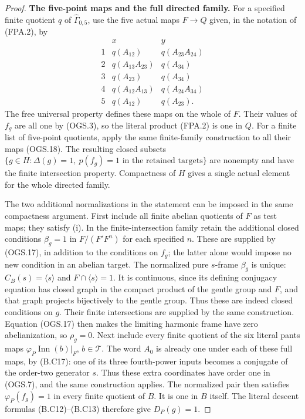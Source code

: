 \begin{proof}
\par\medskip\noindent\textbf{The five-point maps and the full directed family.}\quad
For a specified finite quotient $q$ of
$\widehat\Gamma_{0,5}$, use the five actual maps
$F\to Q$ given, in the notation of (FPA.2), by
\[
\begin{array}{c|cc}
 &x&y\\ \hline
1&q(A_{12})&q(A_{23}A_{24})\\
2&q(A_{13}A_{23})&q(A_{34})\\
3&q(A_{23})&q(A_{34})\\
4&q(A_{12}A_{13})&q(A_{24}A_{34})\\
5&q(A_{12})&q(A_{23}).
\end{array}                                                     \tag{OGS.18}
\]
The free universal property defines these maps on
the whole of $F$.
Their values of $f_g$ are all one by (OGS.3),
so the literal product (FPA.2) is one in $Q$.
For a finite list of five-point quotients, apply
the same finite-family construction to all their
maps (OGS.18).
The resulting closed subsets
$\{g\in H:\Delta(g)=1,\ p(f_g)=1\text{ in the retained targets}\}$
are nonempty and have the finite intersection property.
Compactness of $H$ gives a single actual element
for the whole directed family.

The two additional normalizations in the statement
can be imposed in the same compactness argument.
First include all finite abelian quotients of $F$
as test maps; they satisfy (i).
In the finite-intersection family retain the additional
closed conditions
$\beta_g=1$ in $F/(F'F^n)$ for each specified $n$.
These are supplied by (OGS.17), in addition to the
conditions on $f_g$; the latter alone would impose
no new condition in an abelian target.
The normalized pure $s$-frame $\beta_g$ is unique:
$C_B(s)=\langle s\rangle$ and
$F\cap\langle s\rangle=1$.
It is continuous, since its defining conjugacy
equation has closed graph in the compact product
of the gentle group and $F$, and that graph projects
bijectively to the gentle group.
Thus these are indeed closed conditions on $g$.
Their finite intersections are supplied by the
same construction.  Equation (OGS.17) then makes
the limiting harmonic frame have zero
abelianization, so $\rho_g=0$.
Next include every finite quotient of the six
literal pants maps
$\varphi_P\operatorname{Inn}(b)|_F$, $b\in\mathcal T$.
The word $A_0$ is already one under each of these
full maps, by (B.C17): one of its three fourth-power
inputs becomes a conjugate of the order-two
generator $s$.
Thus these extra coordinates have order one in
(OGS.7), and the same construction applies.
The normalized pair then satisfies
$\varphi_P(f_g)=1$ in every finite quotient of $B$.
It is one in $B$ itself.
The literal descent formulas (B.C12)--(B.C13)
therefore give $D_P(g)=1$.


\end{proof}
